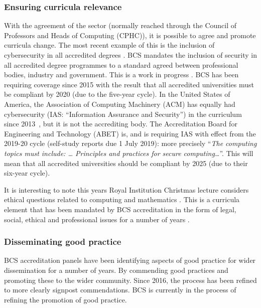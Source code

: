 \documentclass[sigconf]{acmart}
\begin{document}
\subsubsection{Ensuring curricula relevance}
With the agreement of the sector (normally reached through the Council of Professors and Heads of Computing (CPHC)), it is possible to agree and promote curricula change. The most recent example of this is the inclusion of cybersecurity in all accredited degrees \cite{Cricketal2019}. 
BCS mandates the inclusion of security in all accredited degree programmes to a standard agreed between professional bodies, industry and government. This is a work in progress \cite{Irons2016}. BCS has been requiring coverage since 2015 \cite[p.~17--18]{BCS2018a} with the result that all accredited universities must be compliant by 2020 (due to the five-year cycle). In the United States of America, the Association of Computing Machinery (ACM) has equally had cybersecurity (IAS: ``Information Assurance and Security'') in the curriculum since 2013~\cite{ACM2013a}, but it is not the accrediting body. The Accreditation Board for Engineering and Technology (ABET) is, and is requiring IAS with effect from the 2019-20 cycle (self-study reports due 1 July 2019): more precisely \cite[Table 3]{Oudshoornetal2018a} ``{\emph{The computing topics must include: \dots{} Principles and practices for secure computing\dots}}''. This will mean that  all accredited universities should be compliant by 2025 (due to their six-year cycle).

It is interesting to note this years Royal Institution Christmas lecture considers ethical questions related to computing and mathematics \cite{RoyalInstitution2019}. This is a curricula element that has been mandated by BCS accreditation in the form of legal, social, ethical and professional issues for a number of years \cite{Brooke2018}.

\subsubsection{Disseminating good practice}
BCS accreditation panels have been identifying aspects of good practice for wider dissemination for a number of years. By commending good practices and promoting these to the wider community. Since 2016, the process has been refined to more clearly signpost commendations. BCS is currently in the process of refining the promotion of good practice.
\end{document}
